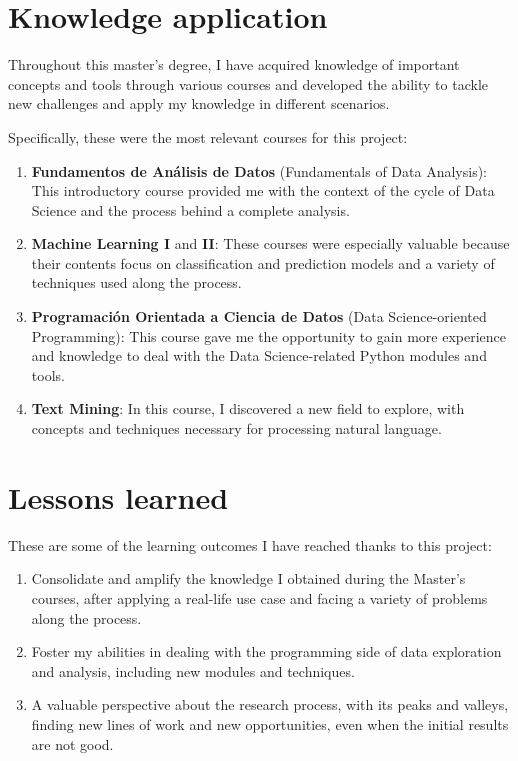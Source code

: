 \documentclass[a4paper, 12pt]{book}
\begin{document}
\section{Knowledge application}
\label{sec:knowledge-application}

Throughout this master's degree, I have acquired knowledge of important concepts and tools through various courses and developed the ability to tackle new challenges and apply my knowledge in different scenarios.

Specifically, these were the most relevant courses for this project:
\begin{enumerate}
\item \textbf{Fundamentos de Análisis de Datos} (Fundamentals of Data Analysis): This introductory course provided me with the context of the cycle of Data Science and the process behind a complete analysis.
\item \textbf{Machine Learning I} and \textbf{II}: These courses were especially valuable because their contents focus on classification and prediction models and a variety of techniques used along the process.
\item \textbf{Programación Orientada a Ciencia de Datos} (Data Science-oriented Programming): This course gave me the opportunity to gain more experience and knowledge to deal with the Data Science-related Python modules and tools.
\item \textbf{Text Mining}: In this course, I discovered a new field to explore, with concepts and techniques necessary for processing natural language.
\end{enumerate}

\section{Lessons learned}
\label{sec:lessons-learned}

These are some of the learning outcomes I have reached thanks to this project:

\begin{enumerate}
  \item Consolidate and amplify the knowledge I obtained during the Master's courses, after applying a real-life use case and facing a variety of problems along the process.
  \item Foster my abilities in dealing with the programming side of data exploration and analysis, including new modules and techniques.
  \item A valuable perspective about the research process, with its peaks and valleys, finding new lines of work and new opportunities, even when the initial results are not good.
\end{enumerate}
\end{document}
